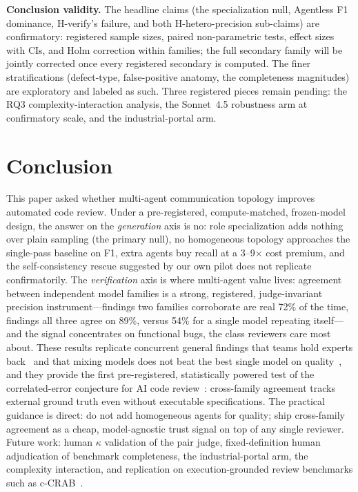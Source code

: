 \documentclass[conference]{IEEEtran}
\begin{document}
\textbf{Conclusion validity.} The headline claims (the specialization
null, Agentless F1 dominance, H-verify's failure, and both
H-hetero-precision sub-claims) are confirmatory: registered sample sizes,
paired non-parametric tests, effect sizes with CIs, and Holm correction
within families; the full secondary family will be jointly corrected once
every registered secondary is computed. The finer stratifications
(defect-type, false-positive anatomy, the completeness magnitudes) are
exploratory and labeled as such. Three registered pieces remain pending:
the RQ3 complexity-interaction analysis, the Sonnet~4.5 robustness arm at
confirmatory scale, and the industrial-portal arm.

\section{Conclusion}

This paper asked whether multi-agent communication topology improves
automated code review. Under a pre-registered, compute-matched,
frozen-model design, the answer on the \emph{generation} axis is no: role
specialization adds nothing over plain sampling (the primary null), no
homogeneous topology approaches the single-pass baseline on F1, extra
agents buy recall at a 3--9$\times$ cost premium, and the self-consistency
rescue suggested by our own pilot does not replicate confirmatorily. The
\emph{verification} axis is where multi-agent value lives: agreement
between independent model families is a strong, registered,
judge-invariant precision instrument---findings two families corroborate
are real 72\% of the time, findings all three agree on 89\%, versus 54\%
for a single model repeating itself---and the signal concentrates on
functional bugs, the class reviewers care most about. These results
replicate concurrent general findings that teams hold experts
back~\cite{pappu} and that mixing models does not beat the best single
model on quality~\cite{selfmoa}, and they provide the first
pre-registered, statistically powered test of the correlated-error
conjecture for AI code review~\cite{zietsman}: cross-family agreement
tracks external ground truth even without executable specifications.
The practical guidance is direct: do not add homogeneous agents for
quality; ship cross-family agreement as a cheap, model-agnostic trust
signal on top of any single reviewer. Future work: human $\kappa$
validation of the pair judge, fixed-definition human adjudication of
benchmark completeness, the industrial-portal arm, the complexity
interaction, and replication on execution-grounded review benchmarks such
as c-CRAB~\cite{crab}.
\end{document}
